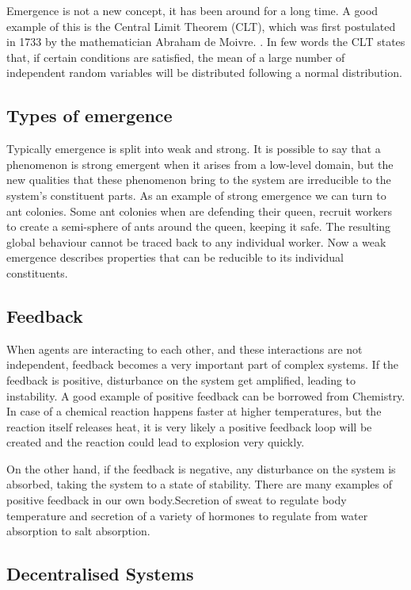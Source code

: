 Emergence is not a new concept, it has been around for a long time. A good example of this is the Central Limit Theorem (CLT), which was first postulated in 1733 by the mathematician Abraham de Moivre. \cite{tijms2007understanding}. In few words the CLT states that, if certain conditions are satisfied, the mean of a large number of independent random variables will be distributed following a normal distribution.

\subsection{Types of emergence}

Typically emergence is split into weak and strong. It is possible to say that a phenomenon is strong emergent when it arises from a low-level domain, but the new qualities that these phenomenon bring to the system are irreducible to the system's constituent parts.\cite{laughlin2008different} As an example of strong emergence we can turn to ant colonies. Some ant colonies when are defending their queen, recruit workers to create a semi-sphere of ants around the queen, keeping it safe. The resulting global behaviour cannot be traced back to any individual worker. Now a weak emergence describes properties that can be reducible to its individual constituents. 

\subsection{Feedback}
\label{subsec:feedback}

When agents are interacting to each other, and these interactions are not independent, feedback becomes a very important part of complex systems. If the feedback is positive, disturbance on the system get amplified, leading to instability. A good example of positive feedback can be borrowed from Chemistry. In case of a chemical reaction happens faster at higher temperatures, but the reaction itself releases heat, it is very likely a positive feedback loop will be created and the reaction could lead to explosion very quickly.

On the other hand, if the feedback is negative, any disturbance on the system is absorbed, taking the system to a state of stability. There are many examples of positive feedback in our own body.Secretion of sweat to regulate body temperature and secretion of a variety of hormones to regulate from water absorption to salt absorption.  

\subsection{Decentralised Systems}


